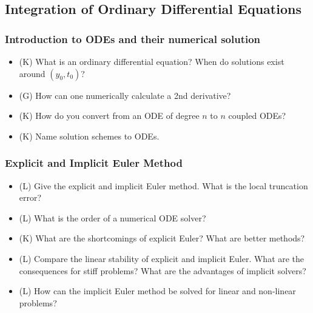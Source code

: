 \subsection*{Integration of Ordinary Differential Equations}

\subsubsection*{Introduction to ODEs and their numerical solution}
\begin{itemize}
    \item (K) What is an ordinary differential equation? When do solutions exist around $(y_0, t_0)$?
    \item (G) How can one numerically calculate a 2nd derivative?
    \item (K) How do you convert from an ODE of degree $n$ to $n$ coupled ODEs?
    \item (K) Name solution schemes to ODEs.
\end{itemize}

\subsubsection*{Explicit and Implicit Euler Method}
\begin{itemize}
    \item (L) Give the explicit and implicit Euler method. What is the local truncation error?
    \item (L) What is the order of a numerical ODE solver?
    \item (K) What are the shortcomings of explicit Euler? What are better methods?
    \item (L) Compare the linear stability of explicit and implicit Euler. What are the consequences for stiff problems? What are the advantages of implicit solvers?
    \item (L) How can the implicit Euler method be solved for linear and non-linear problems?
\end{itemize}

